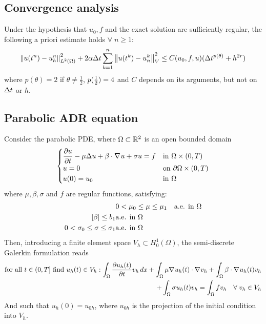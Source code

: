 \subsection{Convergence analysis}
\begin{theorem}
    Under the hypothesis that \(u_0, f\) and the exact solution are sufficiently regular, the following a priori estimate holds \(\forall \; n \geq 1\): 
    \[
        \norm{u(t^n) - u_h^n}_{L^2(\Omega)}^2 + 2\alpha \Delta t \sum_{k=1}^{n}\norm{u(t^k) - u^k_n}_V^2 \leq C(u_0, f, u) (\Delta t^{p(\theta)} + h^{2r})
    \]
    where \(p(\theta) = 2\) if \(\theta \neq \frac{1}{2}\), \(p(\frac{1}{2}) = 4\) and \(C\) depends on its arguments, but not on \(\Delta t\) or \(h\).
\end{theorem}
\subsection{Parabolic ADR equation}
Consider the parabolic PDE, where \(\Omega \subset \mathbb{R}^2\) is an open bounded domain
\begin{equation}
    \begin{cases}
       \displaystyle \partialderivative{u}{t} - \mu \Delta u + \beta \cdot \grad u + \sigma u = f & \txt{in }\Omega \times (0,T) \\
       u = 0 & \txt{on }\boundary \times (0,T) \\
       u(0) = u_0 & \txt{in } \Omega
   \end{cases}
   \label{parabolic_adr_pbl}
\end{equation}
where \(\mu , \beta, \sigma\) and \(f\) are regular functions, satisfying: 
\begin{align*}
    & 0 < \mu_0 \leq \mu \leq \mu_1 & \text{a.e. in } \Omega \\
    \abs{\beta} \leq b_1 & \text{a.e. in } \Omega \\
    0 < \sigma_0 \leq \sigma \leq \sigma_1 & \text{a.e. in } \Omega
\end{align*}
Then, introducing a finite element space \(V_h \subset H^1_0(\Omega)\), the semi-discrete Galerkin formulation reads 
\begin{equation}
    \begin{split}
        \txt{for all } t \in (0, T] \txt{ find }u_h(t) \in V_h : \int_\Omega \partialderivative{u_h(t)}{t} v_h \, dx + \int_\Omega \mu \grad u_h (t) \cdot \grad v_h + \int_\Omega \beta \cdot \grad u_h(t) v_h \\
        + \int_\Omega \sigma u_h(t) v_h = \int_\Omega f v_h \quad \forall \; v_h \in V_h 
    \end{split}
    \label{semi_weak_form_parabolic_adr_pbl}
\end{equation}
And such that \(u_h(0) = u_{0h}\), where \(u_{0h}\) is the projection of the initial condition into \(V_h\).
